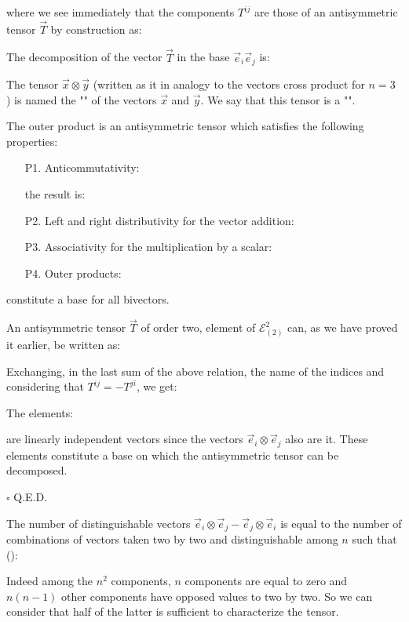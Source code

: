 	where we see immediately that the components $T^{ij}$ are those of an antisymmetric tensor $\vec{T}$ by construction as:
	
	The decomposition of the vector $\vec{T}$ in the base $\vec{e}_i\vec{e}_j$ is:
	
	The tensor $\vec{x}\otimes\vec{y}$ (written as it in analogy to the vectors cross product for $n=3$ ) is named the "" of the vectors $\vec{x}$ and $\vec{y}$. We say that this tensor is a "".
	
	The outer product is an antisymmetric tensor which satisfies the following properties:
	\begin{enumerate}
		\item[P1.] Anticommutativity:
		
		the result is:
		

		\item[P2.] Left and right distributivity for the vector addition:
		

		\item[P3.] Associativity for the multiplication by a scalar:
		

		\item[P4.] Outer products:
		
	\end{enumerate}
	constitute a base for all bivectors.
	\begin{dem}
	An antisymmetric tensor $\vec{T}$ of order two, element of $\mathcal{E}_{(2)}^2$ can, as we have proved it earlier, be written as:
	
	Exchanging, in the last sum of the above relation, the name of the indices and considering that $T^{ij}=-T^{ji}$, we get:
	
	The elements:
	
	are linearly independent vectors since the vectors $\vec{e}_i\otimes\vec{e}_j$ also are it. These elements constitute a base on which the antisymmetric tensor can be decomposed.
	\begin{flushright}
		$\square$  Q.E.D.
	\end{flushright}
	\end{dem}
	The number of distinguishable vectors $\vec{e}_i\otimes\vec{e}_j-\vec{e}_j\otimes\vec{e}_i$ is equal to the number of combinations of vectors taken two by two and distinguishable among $n$ such that ():
	
	Indeed among the $n^2$ components, $n$ components are equal to zero and $n(n-1)$ other components have opposed values to two by two. So we can consider that half of the latter is sufficient to characterize the tensor.

